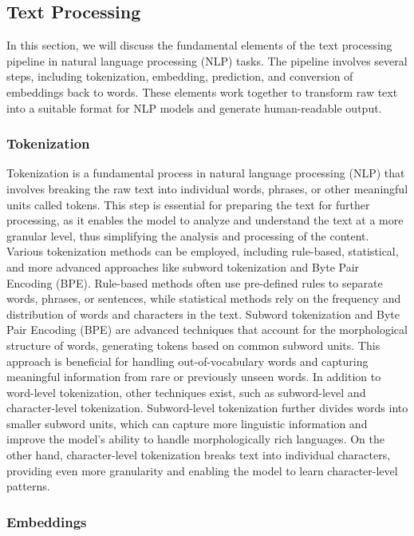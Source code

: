 
\subsection{Text Processing}

In this section, we will discuss the fundamental elements of the text processing pipeline in natural language processing (NLP) tasks. The pipeline involves several steps, including tokenization, embedding, prediction, and conversion of embeddings back to words. These elements work together to transform raw text into a suitable format for NLP models and generate human-readable output.

\subsubsection{Tokenization}

Tokenization is a fundamental process in natural language processing (NLP) that involves breaking the raw text into individual words, phrases, or other meaningful units called tokens. This step is essential for preparing the text for further processing, as it enables the model to analyze and understand the text at a more granular level, thus simplifying the analysis and processing of the content.
Various tokenization methods can be employed, including rule-based, statistical, and more advanced approaches like subword tokenization and Byte Pair Encoding (BPE). Rule-based methods often use pre-defined rules to separate words, phrases, or sentences, while statistical methods rely on the frequency and distribution of words and characters in the text.
Subword tokenization and Byte Pair Encoding (BPE) are advanced techniques that account for the morphological structure of words, generating tokens based on common subword units. This approach is beneficial for handling out-of-vocabulary words and capturing meaningful information from rare or previously unseen words.
In addition to word-level tokenization, other techniques exist, such as subword-level and character-level tokenization. Subword-level tokenization further divides words into smaller subword units, which can capture more linguistic information and improve the model's ability to handle morphologically rich languages. On the other hand, character-level tokenization breaks text into individual characters, providing even more granularity and enabling the model to learn character-level patterns.

\subsubsection{Embeddings}

